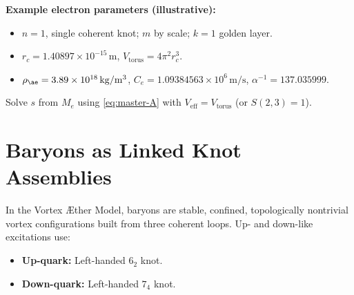 \documentclass[12pt]{article}
\begin{document}
  \noindent
  \textbf{Example electron parameters (illustrative):}
  \begin{itemize}
      \item \(n=1\), single coherent knot; \(m\) by scale; \(k=1\) golden layer.
      \item \(r_c = 1.40897\times 10^{-15}\,\mathrm{m}\), \(V_{\text{torus}}=4\pi^2 r_c^3\).
      \item \(\rho_{\ae}=3.89\times10^{18}\,\mathrm{kg/m^3}\), \(C_e=1.09384563\times10^6\,\mathrm{m/s}\), \(\alpha^{-1}=137.035999\).
  \end{itemize}
  Solve \(s\) from \(M_e\) using \eqref{eq:master-A} with \(V_{\text{eff}}=V_{\text{torus}}\) (or \(S(2,3)=1\)).

  \section{Baryons as Linked Knot Assemblies}
  In the Vortex \AE ther Model, baryons are stable, confined, topologically nontrivial vortex configurations built from three coherent loops. Up- and down-like excitations use:
  \begin{itemize}
      \item \textbf{Up-quark:} Left-handed \(6_2\) knot.
      \item \textbf{Down-quark:} Left-handed \(7_4\) knot.
  \end{itemize}
\end{document}
